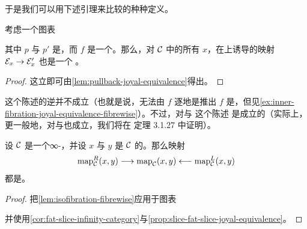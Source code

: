 于是我们可以用下述引理来比较\trMappingSpace{}的种种定义。

\begin{lemma}\label{lem:isofibration-fibrewise}
考虑一个图表
\begin{center}
\end{center}
其中 $p$ 与 $p'$ 是\trIsofibration{}，而 $f$ 是一个\trJoyalEquivalence{}。那么，对
$\mathcal{C}$ 中的所有\trObject{} $x$，在\trFibre{}上诱导的映射 $\mathcal{E}_x \to \mathcal{E}'_x$ 也是一个%
\trJoyalEquivalence{}。
\end{lemma}

\begin{proof}
这立即可由\cref{lem:pullback-joyal-equivalence}得出。
\end{proof}

\begin{remark}\label{rem:fibrewise-converse}
这个陈述的逆并不成立（也就是说，无法由 $f$ 逐\trFibre{}地是\trJoyalEquivalence{}推出
$f$ 是\trJoyalEquivalence{}，但见\cref{ex:inner-fibration-joyal-equivalence-fibrewise}）。不过，对\trLeftFibration{}与%
\trRightFibration{}这个陈述
是成立的（实际上，更一般地，对\trCocartesianFibration{}与\trCartesianFibration{}也成立，我们将在%
定理 3.1.27 中证明）。
\end{remark}

\begin{corollary}\label{cor:mapping-space-homotopy-equivalence}
设 $\mathcal{C}$ 是一个∞-\trCategory{}，并设 $x$ 与 $y$ 是 $\mathcal{C}$ 的\trObject{}。那么映射
\[
\mathrm{map}^R_{\mathcal{C}}(x, y) \longrightarrow \mathrm{map}_{\mathcal{C}}(x, y)
\longleftarrow \mathrm{map}^L_{\mathcal{C}}(x, y)
\]
都是\trHomotopyEquivalence{}。
\end{corollary}

\begin{proof}
把\cref{lem:isofibration-fibrewise}应用于图表
\begin{center}
\hspace{1.6cm}
\end{center}
并使用\cref{cor:fat-slice-infinity-category}与\cref{prop:slice-fat-slice-joyal-equivalence}。
\end{proof}

